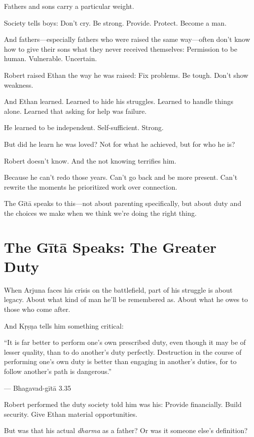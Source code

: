 \documentclass[11pt,twoside]{book}
\begin{document}
Fathers and sons carry a particular weight.

Society tells boys: Don't cry. Be strong. Provide. Protect. Become a man.

And fathers—especially fathers who were raised the same way—often don't know how to give their sons what they never received themselves: Permission to be human. Vulnerable. Uncertain.

Robert raised Ethan the way he was raised: Fix problems. Be tough. Don't show weakness.

And Ethan learned. Learned to hide his struggles. Learned to handle things alone. Learned that asking for help was failure.

He learned to be independent. Self-sufficient. Strong.

But did he learn he was loved? Not for what he achieved, but for who he is?

Robert doesn't know. And the not knowing terrifies him.

Because he can't redo those years. Can't go back and be more present. Can't rewrite the moments he prioritized work over connection.

The Gītā speaks to this—not about parenting specifically, but about duty and the choices we make when we think we're doing the right thing.

\section*{The Gītā Speaks: The Greater Duty}

When Arjuna faces his crisis on the battlefield, part of his struggle is about legacy. About what kind of man he'll be remembered as. About what he owes to those who come after.

And Kṛṣṇa tells him something critical:

\begin{pullquote}
``It is far better to perform one's own prescribed duty, even though it may be of lesser quality, than to do another's duty perfectly. Destruction in the course of performing one's own duty is better than engaging in another's duties, for to follow another's path is dangerous.''

--- Bhagavad-gītā 3.35
\end{pullquote}

Robert performed the duty society told him was his: Provide financially. Build security. Give Ethan material opportunities.

But was that his actual \emph{dharma} as a father? Or was it someone else's definition?
\end{document}
